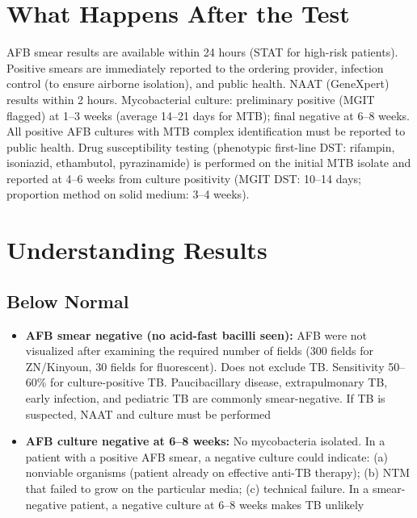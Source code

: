 \section*{What Happens After the Test}
AFB smear results are available within 24 hours (STAT for high-risk patients). Positive smears are immediately reported to the ordering provider, infection control (to ensure airborne isolation), and public health. NAAT (GeneXpert) results within 2 hours. Mycobacterial culture: preliminary positive (MGIT flagged) at 1--3 weeks (average 14--21 days for MTB); final negative at 6--8 weeks. All positive AFB cultures with MTB complex identification must be reported to public health. Drug susceptibility testing (phenotypic first-line DST: rifampin, isoniazid, ethambutol, pyrazinamide) is performed on the initial MTB isolate and reported at 4--6 weeks from culture positivity (MGIT DST: 10--14 days; proportion method on solid medium: 3--4 weeks).

\section*{Understanding Results}

\subsection*{Below Normal}
\begin{itemize}
  \item \textbf{AFB smear negative (no acid-fast bacilli seen):} AFB were not visualized after examining the required number of fields (300 fields for ZN/Kinyoun, 30 fields for fluorescent). Does not exclude TB. Sensitivity 50--60\% for culture-positive TB. Paucibacillary disease, extrapulmonary TB, early infection, and pediatric TB are commonly smear-negative. If TB is suspected, NAAT and culture must be performed
  \item \textbf{AFB culture negative at 6--8 weeks:} No mycobacteria isolated. In a patient with a positive AFB smear, a negative culture could indicate: (a) nonviable organisms (patient already on effective anti-TB therapy); (b) NTM that failed to grow on the particular media; (c) technical failure. In a smear-negative patient, a negative culture at 6--8 weeks makes TB unlikely
\end{itemize}

